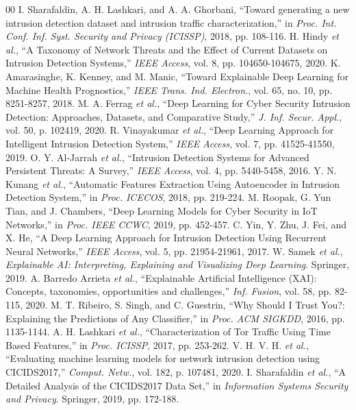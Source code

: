 \documentclass[conference]{IEEEtran}
\begin{document}
\begin{thebibliography}{00}
 I. Sharafaldin, A. H. Lashkari, and A. A. Ghorbani, 
``Toward generating a new intrusion detection dataset and intrusion 
traffic characterization,'' in \emph{Proc. Int. Conf. Inf. Syst. 
Security and Privacy (ICISSP)}, 2018, pp. 108-116.
 H. Hindy \emph{et al.}, ``A Taxonomy of Network Threats and the Effect of Current Datasets on Intrusion Detection Systems,'' \emph{IEEE Access}, vol. 8, pp. 104650-104675, 2020.
 K. Amarasinghe, K. Kenney, and M. Manic, ``Toward Explainable Deep Learning for Machine Health Prognostics,'' \emph{IEEE Trans. Ind. Electron.}, vol. 65, no. 10, pp. 8251-8257, 2018.
 M. A. Ferrag \emph{et al.}, ``Deep Learning for Cyber Security Intrusion Detection: Approaches, Datasets, and Comparative Study,'' \emph{J. Inf. Secur. Appl.}, vol. 50, p. 102419, 2020.
 R. Vinayakumar \emph{et al.}, ``Deep Learning Approach for Intelligent Intrusion Detection System,'' \emph{IEEE Access}, vol. 7, pp. 41525-41550, 2019.
 O. Y. Al-Jarrah \emph{et al.}, ``Intrusion Detection Systems for Advanced Persistent Threats: A Survey,'' \emph{IEEE Access}, vol. 4, pp. 5440-5458, 2016.
 Y. N. Kunang \emph{et al.}, ``Automatic Features Extraction Using Autoencoder in Intrusion Detection System,'' in \emph{Proc. ICECOS}, 2018, pp. 219-224.
 M. Roopak, G. Yun Tian, and J. Chambers, ``Deep Learning Models for Cyber Security in IoT Networks,'' in \emph{Proc. IEEE CCWC}, 2019, pp. 452-457.
 C. Yin, Y. Zhu, J. Fei, and X. He, ``A Deep Learning Approach for Intrusion Detection Using Recurrent Neural Networks,'' \emph{IEEE Access}, vol. 5, pp. 21954-21961, 2017.
 W. Samek \emph{et al.}, \emph{Explainable AI: Interpreting, Explaining and Visualizing Deep Learning}. Springer, 2019.
 A. Barredo Arrieta \emph{et al.}, ``Explainable Artificial Intelligence (XAI): Concepts, taxonomies, opportunities and challenges,'' \emph{Inf. Fusion}, vol. 58, pp. 82-115, 2020.
 M. T. Ribeiro, S. Singh, and C. Guestrin, ``Why Should I Trust You?: Explaining the Predictions of Any Classifier,'' in \emph{Proc. ACM SIGKDD}, 2016, pp. 1135-1144.
 A. H. Lashkari \emph{et al.}, ``Characterization of Tor Traffic Using Time Based Features,'' in \emph{Proc. ICISSP}, 2017, pp. 253-262.
 V. H. V. H. \emph{et al.}, ``Evaluating machine learning models for network intrusion detection using CICIDS2017,'' \emph{Comput. Netw.}, vol. 182, p. 107481, 2020.
 I. Sharafaldin \emph{et al.}, ``A Detailed Analysis of the CICIDS2017 Data Set,'' in \emph{Information Systems Security and Privacy}. Springer, 2019, pp. 172-188.

\end{thebibliography}
\end{document}

